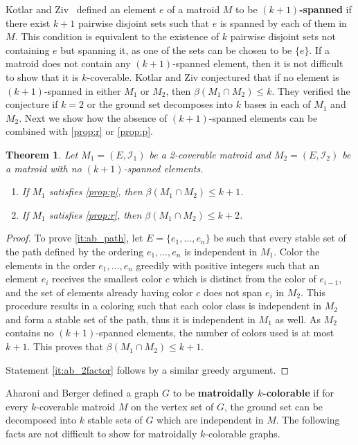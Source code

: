 \documentclass[11pt,a4paper]{article}
\theoremstyle{plain}
\newtheorem{thm}{Theorem}
\theoremstyle{definition}
\newcommand{\cI}{\mathcal{I}}
\begin{document}
Kotlar and Ziv~\cite{kotlar2005partitioning} defined an element $e$ of a matroid $M$ to be \textbf{$(k+1)$-spanned} if there exist $k+1$ pairwise disjoint sets such that $e$ is spanned by each of them in $M$. This condition is equivalent to the existence of $k$ pairwise disjoint sets not containing $e$ but spanning it, as one of the sets can be chosen to be $\{e\}$. If a matroid does not contain any $(k+1)$-spanned element, then it is not difficult to show that it is $k$-coverable. Kotlar and Ziv conjectured that if no element is $(k+1)$-spanned in either $M_1$ or $M_2$, then $\beta(M_1\cap M_2) \le k$. They verified the conjecture if $k=2$ or the ground set decomposes into $k$ bases in each of $M_1$ and $M_2$. Next we show how the absence of $(k+1)$-spanned elements can be combined with \ref{prop:r} or \ref{prop:p}. 

\begin{thm} 
Let $M_1=(E,\cI_1)$ be a 2-coverable matroid and $M_2=(E,\cI_2)$ be a matroid with no $(k+1)$-spanned elements.
\begin{enumerate}[label=(\alph*)]\itemsep0em
\item If $M_1$ satisfies \ref{prop:p}, then $\beta(M_1\cap M_2) \le k+1$. \label{it:ab_path}
\item If $M_1$ satisfies \ref{prop:r}, then $\beta(M_1\cap M_2) \le k+2$. \label{it:ab_2factor}
\end{enumerate}
\end{thm}
\begin{proof}
To prove \ref{it:ab_path}, let $E=\{e_1, \dots, e_n\}$ be such that every stable set of the path defined by the ordering $e_1, \dots, e_n$ is independent in $M_1$. Color the elements in the order $e_1, \dots, e_n$ greedily with positive integers such that an element $e_i$ receives the smallest color $c$ which is distinct from the color of $e_{i-1}$, and the set of elements already having color $c$ does not span $e_i$ in $M_2$. This procedure results in a coloring such that each color class is independent in $M_2$ and form a stable set of the path, thus it is independent in $M_1$ as well. As $M_2$ contains no $(k+1)$-spanned elements, the number of colors used is at most $k+1$. This proves that $\beta(M_1\cap M_2) \le k+1$.

Statement \ref{it:ab_2factor} follows by a similar greedy argument.
\end{proof}

Aharoni and Berger \cite{aharoni2006intersection} defined a graph $G$ to be \textbf{matroidally $k$-colorable} if for every $k$-coverable matroid $M$ on the vertex set of $G$, the ground set can be decomposed into $k$ stable sets of $G$ which are independent in $M$. The following facts are not difficult to show for matroidally $k$-colorable graphs.
\end{document}
